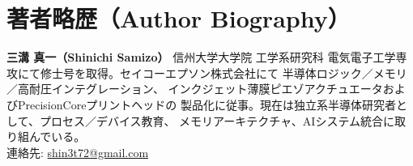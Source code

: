 \documentclass[conference]{IEEEtran}
\begin{document}
\section*{著者略歴（Author Biography）}
\textbf{三溝 真一（Shinichi Samizo）} 信州大学大学院 工学系研究科
電気電子工学専攻にて修士号を取得。セイコーエプソン株式会社にて
半導体ロジック／メモリ／高耐圧インテグレーション、
インクジェット薄膜ピエゾアクチュエータおよびPrecisionCoreプリントヘッドの
製品化に従事。現在は独立系半導体研究者として、プロセス／デバイス教育、
メモリアーキテクチャ、AIシステム統合に取り組んでいる。\\
連絡先: \href{mailto:shin3t72@gmail.com}{shin3t72@gmail.com}
\end{document}
